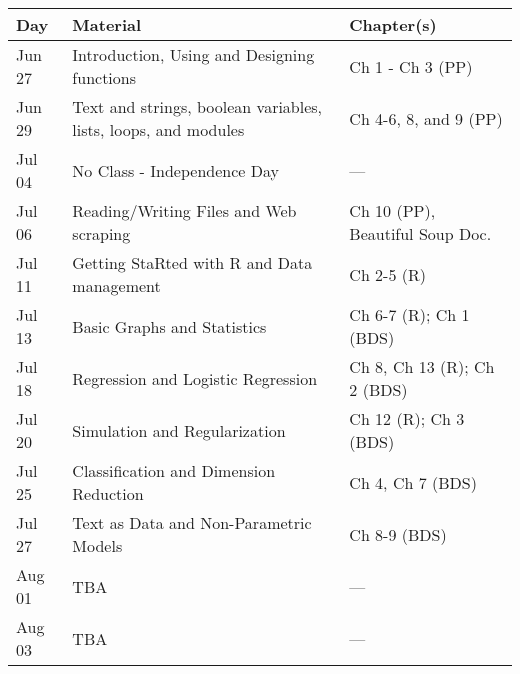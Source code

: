 \documentclass[11pt]{paper}
\begin{document}
\begin{center}
\begin{tabular}{| l | l | l |}\hline
 Day & Material & Chapter(s) \\\hline 
 Jun 27 & Introduction, Using and Designing functions & Ch 1 - Ch 3 (PP) \\
 Jun 29 & Text and strings, boolean variables, lists, loops, and modules & Ch 4-6, 8, and 9 (PP) \\
 Jul 04 & No Class - Independence Day & --- \\
 Jul 06 & Reading/Writing Files and Web scraping & Ch 10 (PP), Beautiful Soup Doc.\\
 Jul 11 & Getting StaRted with R and Data management & Ch 2-5 (R) \\
 Jul 13 & Basic Graphs and Statistics & Ch 6-7 (R); Ch 1 (BDS)\\
 Jul 18 & Regression and Logistic Regression & Ch 8, Ch 13 (R); Ch 2 (BDS)\\
 Jul 20 & Simulation and Regularization & Ch 12 (R); Ch 3 (BDS)\\
 Jul 25 & Classification and Dimension Reduction & Ch 4, Ch 7 (BDS)\\
 Jul 27 & Text as Data and Non-Parametric Models & Ch 8-9 (BDS)\\
 Aug 01 & TBA & ---\\
 Aug 03 & TBA & ---\\\hline
\end{tabular}
\end{center}


\end{document}
